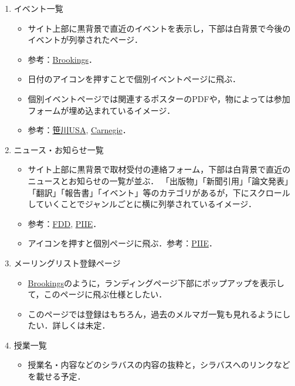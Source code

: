 \documentclass[uplatex,dvipdfmx]{jsarticle}
\begin{document}
\begin{enumerate}
\begin{itemize}
    \end{itemize}
    \item イベント一覧
    \begin{itemize}
        \item サイト上部に黒背景で直近のイベントを表示し，下部は白背景で今後のイベントが列挙されたページ．
        \item 参考：\href{https://www.brookings.edu/events/}{Brookings}．
        \item 日付のアイコンを押すことで個別イベントページに飛ぶ．
        \item 個別イベントページでは関連するポスターのPDFや，物によっては参加フォームが埋め込まれているイメージ．
        \item 参考：\href{https://spfusa.org/event/u-s-japan-relations-portland-oregon-impact-trade-economy-community/}{笹川USA}, \href{https://carnegieendowment.org/2018/02/15/taiwan-strait-update-event-6818}{Carnegie}．
    \end{itemize}
    \item ニュース・お知らせ一覧
    \begin{itemize}
        \item サイト上部に黒背景で取材受付の連絡フォーム，下部は白背景で直近のニュースとお知らせの一覧が並ぶ．
        「出版物」「新聞引用」「論文発表」「翻訳」「報告書」「イベント」等のカテゴリがあるが，下にスクロールしていくことでジャンルごとに横に列挙されているイメージ．
        \item 参考：\href{https://www.fdd.org/media/}{FDD}, \href{https://www.piie.com/newsroom}{PIIE}．
        \item アイコンを押すと個別ページに飛ぶ．参考：\href{https://www.piie.com/newsroom/press-releases/douglas-irwin-and-mary-lovely-join-peterson-institute-international}{PIIE}．
    \end{itemize}
    \item メーリングリスト登録ページ
    \begin{itemize}
        \item \href{https://www.brookings.edu/}{Brookings}のように，ランディングページ下部にポップアップを表示して，このページに飛ぶ仕様としたい．
        \item このページでは登録はもちろん，過去のメルマガ一覧も見れるようにしたい．詳しくは未定．
    \end{itemize}
    \item 授業一覧
    \begin{itemize}
        \item 授業名・内容などのシラバスの内容の抜粋と，シラバスへのリンクなどを載せる予定．

\end{itemize}
\end{enumerate}
\end{document}
